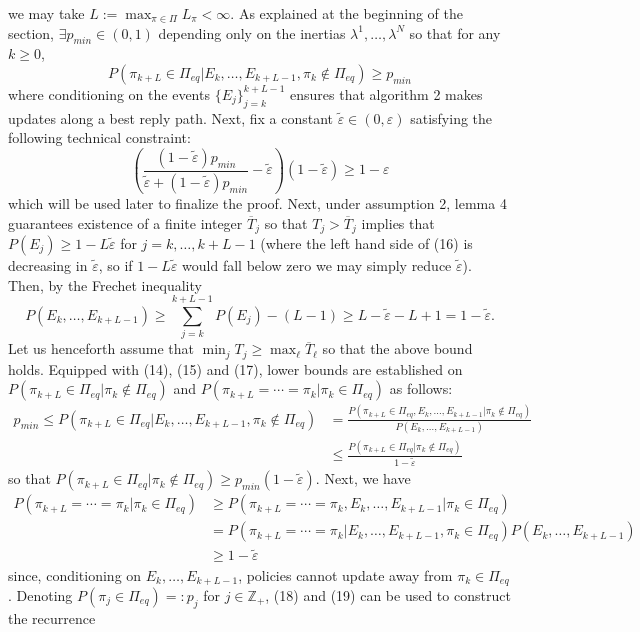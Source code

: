 \documentclass[10pt]{article}
\newcommand{\bp}[1]{\left({#1}\right)}
\newcommand{\mbb}[1]{\mathbb{#1}}
\newcommand{\1}[1]{\mathbbm{1}_{#1}}
\begin{document}
we may take $L:=\max_{\pi\in\Pi}L_\pi<\infty$. As explained at the beginning of the section, $\exists p_{min}\in(0,1)$ depending only on the inertias $\lambda^1,\dots,\lambda^N$ so that for any $k\geq 0$, 
\[P(\pi_{k+L}\in\Pi_{eq}|E_k,\dots,E_{k+L-1},\pi_k\notin\Pi_{eq})\geq p_{min}\tag{15}\]
where conditioning on the events $\{E_j\}_{j=k}^{k+L-1}$ ensures that algorithm 2 makes updates along a best reply path. Next, fix a constant $\tilde{\varepsilon}\in(0,\varepsilon)$ satisfying the following technical constraint:
\[\bp{\frac{(1-\tilde{\varepsilon})p_{min}}{\tilde{\varepsilon}+(1-\tilde{\varepsilon})p_{min}}-\tilde{\varepsilon}}(1-\tilde{\varepsilon})\geq 1-\varepsilon\tag{16}\]
which will be used later to finalize the proof. Next, under assumption 2, lemma 4 guarantees existence of a finite integer $\overline{T}_j$ so that $T_j>\overline{T}_j$ implies that $P(E_j)\geq 1-L\tilde{\varepsilon}$ for $j=k,\dots,k+L-1$ (where the left hand side of (16) is decreasing in $\tilde{\varepsilon}$, so if $1-L\tilde{\varepsilon}$ would fall below zero we may simply reduce $\tilde{\varepsilon}$). Then, by the Frechet inequality
\[P(E_k,\dots,E_{k+L-1})\geq\sum_{j=k}^{k+L-1}P(E_j)-(L-1)\geq L-\tilde{\varepsilon}-L+1=1-\tilde{\varepsilon}.\tag{17}\]
Let us henceforth assume that $\min_j T_j\geq\max_\ell\overline{T}_\ell$ so that the above bound holds. Equipped with (14), (15) and (17), lower bounds are established on $P(\pi_{k+L}\in\Pi_{eq}|\pi_k\notin\Pi_{eq})$ and $P(\pi_{k+L}=\cdots=\pi_k|\pi_k\in\Pi_{eq})$ as follows:
\begin{align*}
    p_{min}\leq P(\pi_{k+L}\in\Pi_{eq}|E_k,\dots,E_{k+L-1},\pi_k\notin\Pi_{eq})&=\frac{P(\pi_{k+L}\in\Pi_{eq},E_k,\dots,E_{k+L-1}|\pi_k\notin\Pi_{eq})}{P(E_k,\dots,E_{k+L-1})}\\
    &\leq \frac{P(\pi_{k+L}\in\Pi_{eq}|\pi_k\notin\Pi_{eq})}{1-\tilde{\varepsilon}}\tag{18}
\end{align*}
so that $P(\pi_{k+L}\in\Pi_{eq}|\pi_k\notin\Pi_{eq})\geq p_{min}(1-\tilde{\varepsilon})$. Next, we have
\begin{align*}
    P(\pi_{k+L}=\cdots=\pi_k|\pi_k\in\Pi_{eq})&\geq P(\pi_{k+L}=\cdots=\pi_k,E_k,\dots,E_{k+L-1}|\pi_k\in\Pi_{eq})\\
    &=P(\pi_{k+L}=\cdots=\pi_k|E_k,\dots,E_{k+L-1},\pi_k\in\Pi_{eq})P(E_k,\dots,E_{k+L-1})\\
    &\geq 1-\tilde{\varepsilon}\tag{19}
\end{align*}
since, conditioning on $E_k,\dots,E_{k+L-1}$, policies cannot update away from $\pi_k\in\Pi_{eq}$. Denoting $P(\pi_j\in\Pi_{eq})=:p_{j}$ for $j\in\mbb{Z}_+$, (18) and (19) can be used to construct the recurrence
\end{document}
